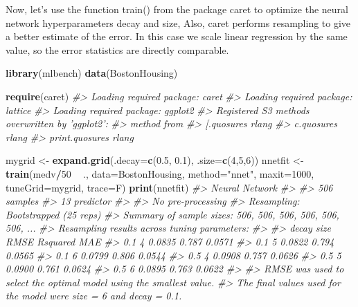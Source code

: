 \documentclass[]{book}
\newenvironment{Shaded}{\begin{snugshade}}{\end{snugshade}}
\newcommand{\CommentTok}[1]{\textcolor[rgb]{0.56,0.35,0.01}{\textit{#1}}}
\newcommand{\DataTypeTok}[1]{\textcolor[rgb]{0.13,0.29,0.53}{#1}}
\newcommand{\DecValTok}[1]{\textcolor[rgb]{0.00,0.00,0.81}{#1}}
\newcommand{\FloatTok}[1]{\textcolor[rgb]{0.00,0.00,0.81}{#1}}
\newcommand{\KeywordTok}[1]{\textcolor[rgb]{0.13,0.29,0.53}{\textbf{#1}}}
\newcommand{\NormalTok}[1]{#1}
\newcommand{\OperatorTok}[1]{\textcolor[rgb]{0.81,0.36,0.00}{\textbf{#1}}}
\newcommand{\StringTok}[1]{\textcolor[rgb]{0.31,0.60,0.02}{#1}}
\begin{document}
Now, let's use the function train() from the package caret to optimize the neural network hyperparameters decay and size, Also, caret performs resampling to give a better estimate of the error. In this case we scale linear regression by the same value, so the error statistics are directly comparable.

\begin{Shaded}
\begin{Highlighting}[]
 \KeywordTok{library}\NormalTok{(mlbench)}
 \KeywordTok{data}\NormalTok{(BostonHousing)}
 
\KeywordTok{require}\NormalTok{(caret)}
\CommentTok{#> Loading required package: caret}
\CommentTok{#> Loading required package: lattice}
\CommentTok{#> Loading required package: ggplot2}
\CommentTok{#> Registered S3 methods overwritten by 'ggplot2':}
\CommentTok{#>   method         from }
\CommentTok{#>   [.quosures     rlang}
\CommentTok{#>   c.quosures     rlang}
\CommentTok{#>   print.quosures rlang}
 
\NormalTok{mygrid <-}\StringTok{ }\KeywordTok{expand.grid}\NormalTok{(}\DataTypeTok{.decay=}\KeywordTok{c}\NormalTok{(}\FloatTok{0.5}\NormalTok{, }\FloatTok{0.1}\NormalTok{), }\DataTypeTok{.size=}\KeywordTok{c}\NormalTok{(}\DecValTok{4}\NormalTok{,}\DecValTok{5}\NormalTok{,}\DecValTok{6}\NormalTok{))}
\NormalTok{nnetfit <-}\StringTok{ }\KeywordTok{train}\NormalTok{(medv}\OperatorTok{/}\DecValTok{50} \OperatorTok{~}\StringTok{ }\NormalTok{., }\DataTypeTok{data=}\NormalTok{BostonHousing, }\DataTypeTok{method=}\StringTok{"nnet"}\NormalTok{, }\DataTypeTok{maxit=}\DecValTok{1000}\NormalTok{, }\DataTypeTok{tuneGrid=}\NormalTok{mygrid, }\DataTypeTok{trace=}\NormalTok{F) }
\KeywordTok{print}\NormalTok{(nnetfit)}
\CommentTok{#> Neural Network }
\CommentTok{#> }
\CommentTok{#> 506 samples}
\CommentTok{#>  13 predictor}
\CommentTok{#> }
\CommentTok{#> No pre-processing}
\CommentTok{#> Resampling: Bootstrapped (25 reps) }
\CommentTok{#> Summary of sample sizes: 506, 506, 506, 506, 506, 506, ... }
\CommentTok{#> Resampling results across tuning parameters:}
\CommentTok{#> }
\CommentTok{#>   decay  size  RMSE    Rsquared  MAE   }
\CommentTok{#>   0.1    4     0.0835  0.787     0.0571}
\CommentTok{#>   0.1    5     0.0822  0.794     0.0565}
\CommentTok{#>   0.1    6     0.0799  0.806     0.0544}
\CommentTok{#>   0.5    4     0.0908  0.757     0.0626}
\CommentTok{#>   0.5    5     0.0900  0.761     0.0624}
\CommentTok{#>   0.5    6     0.0895  0.763     0.0622}
\CommentTok{#> }
\CommentTok{#> RMSE was used to select the optimal model using the smallest value.}
\CommentTok{#> The final values used for the model were size = 6 and decay = 0.1.}
\end{Highlighting}
\end{Shaded}
\end{document}
